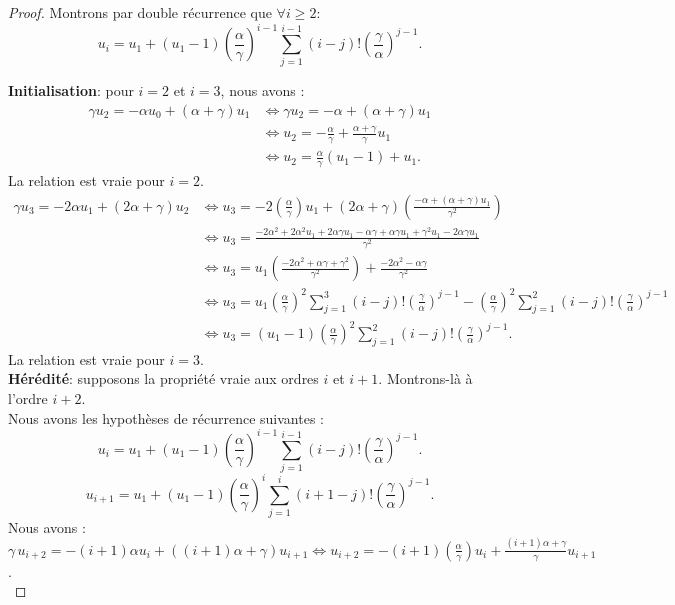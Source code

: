 \documentclass[12pt,a4paper]{report}
\theoremstyle{remark}
\begin{document}
\begin{proof}
Montrons par double récurrence que $\forall i \geqslant 2$:
$$u_i = u_1 + (u_1 - 1)\left(\frac{\alpha}{\gamma}\right)^{i-1} \sum_{j=1}^{i-1}(i-j)!\left(\frac{\gamma}{\alpha}\right)^{j-1}.$$

\textbf{Initialisation}: pour $i=2$ et $i=3$, nous avons :
\begin{align*}
\gamma u_2 = -\alpha u_0 + (\alpha + \gamma) u_1 &\iff \gamma u_2 = - \alpha + (\alpha + \gamma)u_1 \\
&\iff u_2 = - \frac{\alpha}{\gamma} + \frac{\alpha + \gamma}{\gamma} u_1 \\
&\iff u_2 = \frac{\alpha}{\gamma}(u_1 - 1) + u_1.
\end{align*}
La relation est vraie pour $i=2$.
\begin{align*}
\gamma u_3 = -2 \alpha u_1 + (2 \alpha + \gamma) u_2 &\iff u_3 = -2 \left(\frac{\alpha}{\gamma}\right) u_1 + (2 \alpha + \gamma)\left(\frac{-\alpha + (\alpha + \gamma) u_1}{\gamma^2}\right) \\
&\iff u_3 = \frac{-2 \alpha^2 + 2 \alpha^2 u_1 + 2 \alpha \gamma u_1 - \alpha \gamma + \alpha \gamma u_1 + \gamma^2 u_1 -2 \alpha \gamma u_1}{\gamma^2} \\
&\iff u_3 = u_1 \left(\frac{-2 \alpha^2 + \alpha \gamma + \gamma^2}{\gamma^2}\right) + \frac{-2 \alpha^2 - \alpha \gamma}{\gamma^2} \\
&\iff u_3 = u_1 \left(\frac{\alpha}{\gamma}\right)^{2} \sum_{j=1}^{3}(i-j)!\left(\frac{\gamma}{\alpha}\right)^{j-1} - \left(\frac{\alpha}{\gamma}\right)^{2} \sum_{j=1}^{2}(i-j)!\left(\frac{\gamma}{\alpha}\right)^{j-1} \\
&\iff u_3 = (u_1 - 1)\left(\frac{\alpha}{\gamma}\right)^{2} \sum_{j=1}^{2}(i-j)!\left(\frac{\gamma}{\alpha}\right)^{j-1}.
\end{align*}
La relation est vraie pour $i=3$.\\

\textbf{Hérédité}: supposons la propriété vraie aux ordres $i$ et $i+1$. Montrons-là à l'ordre $i+2$.\\

Nous avons les hypothèses de récurrence suivantes : 
$$u_i = u_1 + (u_1 - 1)\left(\frac{\alpha}{\gamma}\right)^{i-1} \sum_{j=1}^{i-1}(i-j)!\left(\frac{\gamma}{\alpha}\right)^{j-1}.$$
$$u_{i+1} = u_1 + (u_1 - 1)\left(\frac{\alpha}{\gamma}\right)^{i} \sum_{j=1}^{i}(i+1-j)!\left(\frac{\gamma}{\alpha}\right)^{j-1}
.$$
Nous avons : $\gamma \, u_{i+2} = -(i+1) \alpha u_i + ((i+1) \alpha + \gamma) u_{i+1} \iff u_{i+2} = -(i+1) \left(\frac{\alpha}{\gamma}\right) u_i + \frac{(i+1) \alpha + \gamma}{\gamma} u_{i+1}$.
\\


\end{proof}
\end{document}
